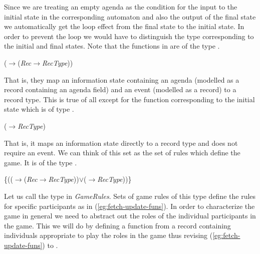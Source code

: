 Since we are treating an empty agenda as the condition for the input
to the initial state in the corresponding automaton and also the
output of the final state we automatically get the loop effect from
the final state to the initial state.  In order to prevent the loop we
would have to distinguish the type corresponding to the initial and
final states. Note that the functions in \preveg{} are of the
type \nexteg{}.
\begin{ex}
($\rightarrow$(\textit{Rec}$\rightarrow$\textit{RecType}))
\end{ex}
That is, they map an information state containing an agenda (modelled
as a record containing an agenda field) and an
event (modelled as a record) to a record type.   This is true of all
except for the function corresponding to the initial state which is of
type \nexteg{}.
\begin{ex}
($\rightarrow$\textit{RecType})
\end{ex}
That is, it maps an information state directly to a record type and does not
require an event.  We can think of this set as the set of rules which
define the game.  It is of the type \nexteg{}.
\begin{ex}
\{(($\rightarrow$(\textit{Rec}$\rightarrow$\textit{RecType}))$\vee$($\rightarrow$\textit{RecType}))\}
\end{ex}
Let us call the type in \preveg{} \textit{GameRules}.  Sets of game
rules of this type define the rules for specific participants as in
(\ref{eg:fetch-update-funs}).  In order to characterize the game in
general we need to abstract out the roles of the individual
participants in the game.  This we will do by defining a function from
a record containing individuals appropriate to play the roles in the
game thus revising (\ref{eg:fetch-update-funs}) to \nexteg{}.

